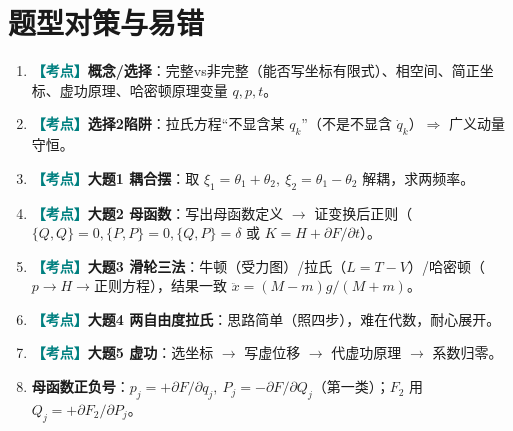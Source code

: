 \documentclass[UTF8,a4paper,11pt]{ctexart}
\newcommand{\km}{\textcolor{teal}{\textbf{【考点】}}}
\begin{document}
\section{题型对策与易错}
\begin{enumerate}[itemsep=3pt]
  \item \km \textbf{概念/选择}：完整vs非完整（能否写坐标有限式）、相空间、简正坐标、虚功原理、哈密顿原理变量 $q,p,t$。
  \item \km \textbf{选择2陷阱}：拉氏方程“不显含某 $q_k$”（不是不显含 $\dot q_k$）$\Rightarrow$ 广义动量守恒。
  \item \km \textbf{大题1 耦合摆}：取 $\xi_1=\theta_1+\theta_2,\ \xi_2=\theta_1-\theta_2$ 解耦，求两频率。
  \item \km \textbf{大题2 母函数}：写出母函数定义 $\rightarrow$ 证变换后正则（$\{Q,Q\}=0,\{P,P\}=0,\{Q,P\}=\delta$ 或 $K=H+\partial F/\partial t$）。
  \item \km \textbf{大题3 滑轮三法}：牛顿（受力图）/拉氏（$L=T-V$）/哈密顿（$p\to H\to$正则方程），结果一致 $\ddot x=(M-m)g/(M+m)$。
  \item \km \textbf{大题4 两自由度拉氏}：思路简单（照四步），难在代数，耐心展开。
  \item \km \textbf{大题5 虚功}：选坐标 $\rightarrow$ 写虚位移 $\rightarrow$ 代虚功原理 $\rightarrow$ 系数归零。
  \item \textbf{母函数正负号}：$p_j=+\partial F/\partial q_j,\ P_j=-\partial F/\partial Q_j$（第一类）；$F_2$ 用 $Q_j=+\partial F_2/\partial P_j$。
\end{enumerate}
\end{document}
